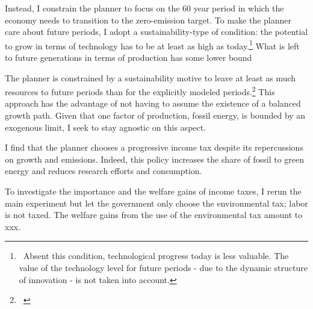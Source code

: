  Instead, I constrain the planner to focus on the 60 year period in which the economy needs to transition to the zero-emission target. To make the planner care about future periods, I adopt a sustainability-type of condition: the potential to grow in terms of technology has to be at least as high as today.\footnote{\ Absent this condition, technological progress today is less valuable. The value of the technology level for future periods - due to the dynamic structure of innovation - is not taken into account. } 
 What is left to future generations in terms of production has some lower bound


 The planner is constrained by a sustainability motive to leave at least as much resources to future periods than for the explicitly modeled periods.\footnote{\ }
This approach has the advantage of not having to assume the existence of a balanced growth path. Given that one factor of production, fossil energy, is bounded by an exogenous limit, I seek to stay agnostic on this aspect.

I find that the planner chooses a progressive income tax despite its repercussions on growth and emissions. Indeed, this policy increases the share of fossil to green energy and reduces research efforts and consumption. %
 

To investigate the importance and the welfare gains of income taxes, I rerun the main experiment but let the government only choose the environmental tax; labor is not taxed. The welfare gains from the use of the environmental tax amount to xxx. \textit{}

